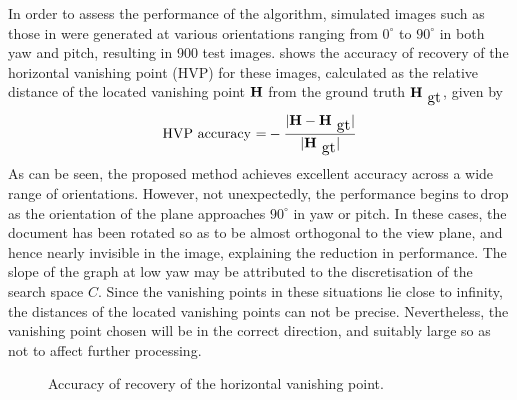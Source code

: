 In order to assess the performance of the algorithm, simulated images such as
those in  were generated at various orientations ranging from
$0^\circ$ to $90^\circ$ in both yaw and pitch, resulting in 900 test images. 
 shows the accuracy of recovery of the horizontal vanishing
point (HVP) for these images, 
calculated as the relative distance of the located vanishing point ${ \bf H }$ 
from the ground truth $\myvec{H}_{\mbox{\small gt}}$, given by
\begin{equation} 
\mbox{HVP accuracy =} -\frac{|\myvec{H}-\myvec{H}_{\mbox{\small gt}}|}{|\myvec{H}_{\mbox{\small gt}}|}
\end{equation}
As can be seen, the proposed method achieves excellent accuracy across a wide
range of orientations. However, not unexpectedly, the performance begins to
drop as the orientation of the plane approaches $90^\circ$ in yaw or pitch. In
these cases, the document has been rotated so as to be almost orthogonal to the
view plane, and hence nearly invisible in the image, explaining the reduction
in performance. The slope of the graph at low yaw may be attributed to the
discretisation of the search space $C$. Since the vanishing points in these
situations lie close to infinity, the distances of the located vanishing points
can not be precise. Nevertheless, the vanishing point chosen will be in the
correct direction, and suitably large so as not to affect further processing.


\begin{figure}[h]
\centering
\begin{center}
\hspace*{4mm}
\end{center}
\caption{Accuracy of recovery of the horizontal vanishing point.}
\end{figure}




